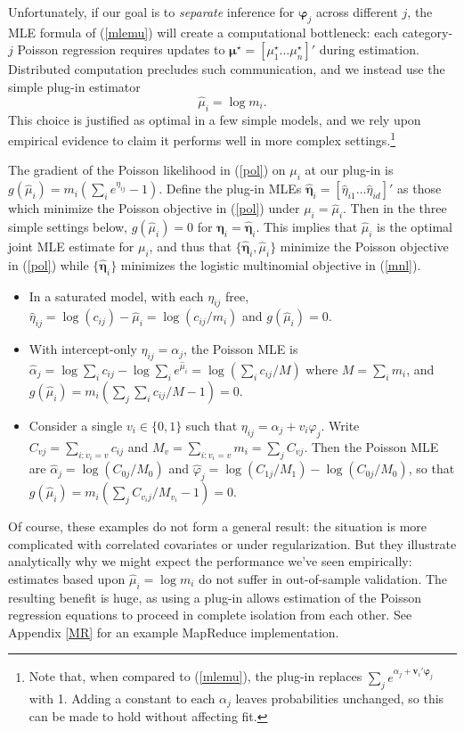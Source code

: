 \documentclass[12pt]{article}
\newcommand{\bs}[1]{\boldsymbol{#1}}
\newcommand{\bm}[1]{\mathbf{#1}}
\begin{document}
Unfortunately, if our goal is to {\it separate} inference for $\bs{\varphi}_j$
across different $j$, the MLE formula of (\ref{mlemu}) will create a
computational bottleneck: each category-$j$ Poisson regression requires
updates to $\bs{\mu}^\star = [\mu^\star_1 \ldots \mu^\star_n]'$ during
estimation.  Distributed computation precludes such communication, and
we instead use the simple plug-in estimator
\begin{equation}\label{plugin}
\hat \mu_i = \log m_i.
\end{equation}
This choice is justified as optimal in a few simple models, and we rely upon
  empirical evidence to claim it performs well in more complex
  settings.\footnote{ Note that, when compared to (\ref{mlemu}), the plug-in
  replaces $\sum_j e^{\alpha_j
+ \bm{v}_i'\bs{\varphi}_j}$ with 1.  Adding a constant to each
  $\alpha_j$ leaves probabilities unchanged, so this can be made to hold without
  affecting fit.}  


The gradient of the Poisson likelihood in (\ref{pol}) on $\mu_i$ at our
plug-in is $g(\hat \mu_i) = m_i \left(\sum_i e^{\eta_{ij}}-1\right)$.  
Define the plug-in MLEs $\bs{\hat\eta}_{i}
  = [\hat\eta_{i1}\ldots\hat\eta_{id}]'$ as those which minimize the Poisson
  objective in (\ref{pol}) under $\mu_i=\hat\mu_i$.  Then in the
three simple settings below, $g(\hat
\mu_i)=0$ for $\bs{\eta}_i = \bs{\hat\eta}_{i}$. This implies that $\hat\mu_i$
is the optimal joint MLE estimate for $\mu_i$, and thus that
 $\{\bs{\hat\eta}_{i},\hat\mu_i\}$ minimize the Poisson objective in
 (\ref{pol}) while $\{ \bs{\hat\eta}_{i}\}$ minimizes the logistic multinomial
 objective in (\ref{mnl}).
\begin{itemize}
\item In a saturated model, with
each $\eta_{ij}$ free, $\hat
\eta_{ij} = \log(c_{ij}) - \hat \mu_i = \log(c_{ij}/m_i)$ and $g(\hat
\mu_i) = 0$.
\item With intercept-only $\eta_{ij} =
\alpha_j$, the Poisson MLE is $\hat\alpha_j = \log \sum_i c_{ij} - \log
\sum_i e^{\hat\mu_i} = \log\left( \sum_i c_{ij}/M \right)$ where $M = \sum_i
m_i$, and $g(\hat \mu_i) = m_i(\sum_j \sum_i c_{ij}/M -1) = 0$.
\item Consider a single
$v_i \in
\{0,1\}$ such that $\eta_{ij} = \alpha_j + v_i \varphi_j$.  Write $C_{vj} = \sum_{i: v_i=v} c_{ij}$ and  $M_{v} = \sum_{i:
v_i=v} m_i = \sum_j C_{vj}$.  Then the Poisson MLE are $\hat\alpha_j =
\log(C_{0j}/M_0)$ and $\hat\varphi_j = \log(C_{1j}/M_1) - \log(C_{0j}/M_0)$,
so that  $g(\hat \mu_i) = m_i\left(\sum_j C_{v_ij}/M_{v_i} -1 \right) =0$.
\end{itemize}
Of course, these examples do not form a general result: the situation is more
complicated with correlated covariates or under regularization. But they
illustrate analytically why we might expect the performance we've seen
empirically: estimates based upon $\hat \mu_i = \log m_i$ do not suffer in
out-of-sample validation. The resulting benefit is huge, as using a plug-in
allows estimation of the Poisson regression equations to proceed in complete
isolation from each other.  See Appendix \ref{MR} for an example MapReduce \citep{dean_mapreduce:_2004} implementation.
\end{document}
